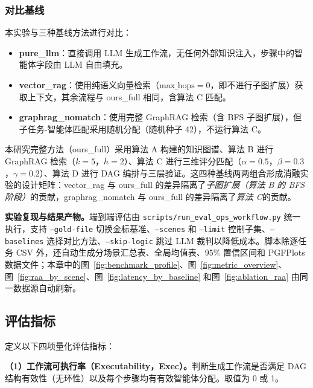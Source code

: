 \subsubsection{对比基线}

本实验与三种基线方法进行对比：

\begin{itemize}
    \item \textbf{pure\_llm}：直接调用 LLM 生成工作流，无任何外部知识注入，步骤中的智能体字段由 LLM 自由填充。
    \item \textbf{vector\_rag}：使用纯语义向量检索（$\text{max\_hops}=0$，即不进行子图扩展）获取上下文，其余流程与 ours\_full 相同，含算法 C 匹配。
    \item \textbf{graphrag\_nomatch}：使用完整 GraphRAG 检索（含 BFS 子图扩展），但子任务-智能体匹配采用随机分配（随机种子 42），不运行算法 C。
\end{itemize}

本研究完整方法（ours\_full）采用算法 A 构建的知识图谱、算法 B 进行 GraphRAG 检索（$k=5$，$h=2$）、算法 C 进行三维评分匹配（$\alpha=0.5$，$\beta=0.3$，$\gamma=0.2$）、算法 D 进行 DAG 编排与三层验证。这四种基线两两组合形成消融实验的设计矩阵：vector\_rag 与 ours\_full 的差异隔离了\emph{子图扩展（算法 B 的 BFS 阶段）}的贡献，graphrag\_nomatch 与 ours\_full 的差异隔离了\emph{算法 C}的贡献。

\textbf{实验复现与结果产物。}端到端评估由 \texttt{scripts/run\_eval\_ops\_workflow.py} 统一执行，支持 \texttt{--gold-file} 切换金标基准、\texttt{--scenes} 和 \texttt{--limit} 控制子集、\texttt{--baselines} 选择对比方法、\texttt{--skip-logic} 跳过 LLM 裁判以降低成本。脚本除逐任务 CSV 外，还自动生成分场景汇总表、全局均值表、95\% 置信区间和 PGFPlots 数据文件；本章中的图~\ref{fig:benchmark_profile}、图~\ref{fig:metric_overview}、图~\ref{fig:raa_by_scene}、图~\ref{fig:latency_by_baseline} 和图~\ref{fig:ablation_raa} 由同一数据源自动刷新。

\subsection{评估指标}

定义以下四项量化评估指标：

\textbf{（1）工作流可执行率（Executability，Exec）。}判断生成工作流是否满足 DAG 结构有效性（无环性）以及每个步骤均有有效智能体分配。取值为 0 或 1。

